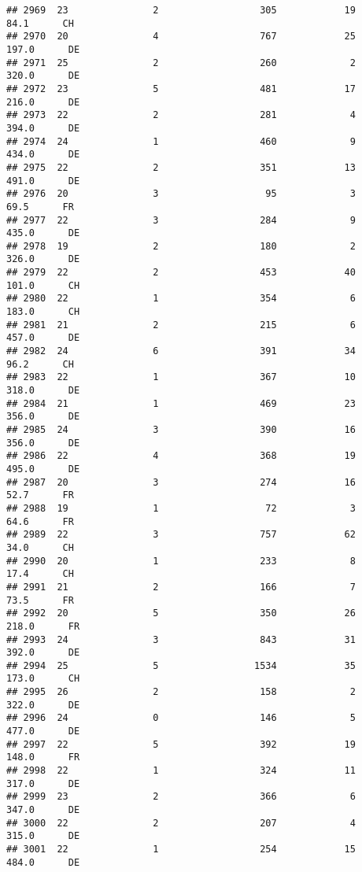 \documentclass[
]{article}
\begin{document}
\begin{verbatim}
## 2969  23               2                  305            19     84.1      CH
## 2970  20               4                  767            25    197.0      DE
## 2971  25               2                  260             2    320.0      DE
## 2972  23               5                  481            17    216.0      DE
## 2973  22               2                  281             4    394.0      DE
## 2974  24               1                  460             9    434.0      DE
## 2975  22               2                  351            13    491.0      DE
## 2976  20               3                   95             3     69.5      FR
## 2977  22               3                  284             9    435.0      DE
## 2978  19               2                  180             2    326.0      DE
## 2979  22               2                  453            40    101.0      CH
## 2980  22               1                  354             6    183.0      CH
## 2981  21               2                  215             6    457.0      DE
## 2982  24               6                  391            34     96.2      CH
## 2983  22               1                  367            10    318.0      DE
## 2984  21               1                  469            23    356.0      DE
## 2985  24               3                  390            16    356.0      DE
## 2986  22               4                  368            19    495.0      DE
## 2987  20               3                  274            16     52.7      FR
## 2988  19               1                   72             3     64.6      FR
## 2989  22               3                  757            62     34.0      CH
## 2990  20               1                  233             8     17.4      CH
## 2991  21               2                  166             7     73.5      FR
## 2992  20               5                  350            26    218.0      FR
## 2993  24               3                  843            31    392.0      DE
## 2994  25               5                 1534            35    173.0      CH
## 2995  26               2                  158             2    322.0      DE
## 2996  24               0                  146             5    477.0      DE
## 2997  22               5                  392            19    148.0      FR
## 2998  22               1                  324            11    317.0      DE
## 2999  23               2                  366             6    347.0      DE
## 3000  22               2                  207             4    315.0      DE
## 3001  22               1                  254            15    484.0      DE

\end{verbatim}
\end{document}
